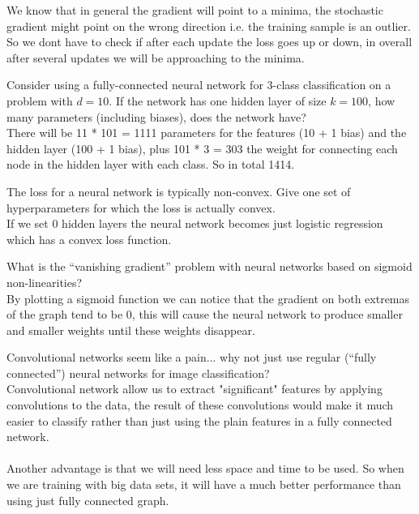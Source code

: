 \documentclass{article}
\def\ans#1{{\color{ans}#1}}
\begin{document}
{\ans{
    We know that in general the gradient will point to a minima, the stochastic gradient might point on the 
    wrong direction i.e. the training sample is an outlier. So we dont have to check if after each update 
    the loss goes up or down, in overall after several updates we will be approaching to the minima.
}
\item{Consider using a fully-connected neural network for 3-class classification on a problem with $d=10$. If the network has one hidden layer of size $k=100$, how many parameters (including biases), does the network have?} \\
\ans{
    There will be 11 * 101 = 1111 parameters for the features (10 + 1 bias) and the hidden layer (100 + 1 bias), 
    plus  101 * 3 = 303 the weight for connecting each node in the hidden layer with each class. So in total 1414.
}
\item{The loss for a neural network is typically non-convex. Give one set of hyperparameters for which the loss is actually convex.} \\
\ans{
    If we set 0 hidden layers the neural network becomes just logistic regression which has a convex loss function.
}
\item What is the ``vanishing gradient'' problem with neural networks based on sigmoid non-linearities? \\
\ans{
    By plotting a sigmoid function we can notice that the gradient on both extremas of the 
    graph tend to be 0, this will cause the neural network to produce smaller and smaller 
    weights until these weights disappear.
}
\item{Convolutional networks seem like a pain... why not just use regular (``fully connected'') neural networks for image classification?} \\
\ans{
    Convolutional network allow us to extract "significant" features by applying convolutions to 
    the data, the result of these convolutions would make it much easier to classify rather than 
    just using the plain features in a fully connected network. \\ \\
    Another advantage is that we will need less space and time to be used. So when we are training with 
    big data sets, it will have a much better performance than using just fully connected graph.
}
}
\end{document}
